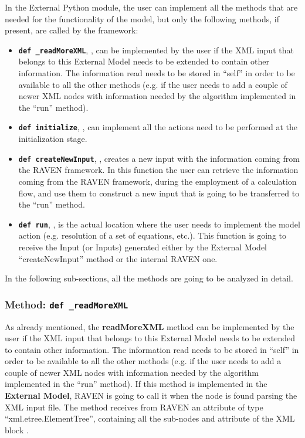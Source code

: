 In the External Python module, the user can implement all the methods that are
needed for the functionality of the model, but only the following methods, if
present, are called by the framework:
\begin{itemize}
  \item \texttt{\textbf{def \_readMoreXML}}, , can be
  implemented by the user if the XML input that belongs to this External Model
  needs to be extended to contain other information.
  The information read needs to be stored in ``self'' in order to be available
  to all the other methods (e.g. if the user needs to add a couple of newer XML
  nodes with information needed by the algorithm implemented in the ``run''
  method).
  \item \texttt{\textbf{def initialize}}, , can
  implement all the actions need to be performed at the initialization stage.
  \item \texttt{\textbf{def createNewInput}}, , creates
  a new input with the information coming from the RAVEN framework.
  In this function the user can retrieve the information coming from the RAVEN
  framework, during the employment of a calculation flow, and use them to
  construct a new input that is going to be transferred to the ``run'' method.
  \item \texttt{\textbf{def run}}, , is the actual
  location where the user needs to implement the model action (e.g. resolution
  of a set of equations, etc.).
  This function is going to receive the Input (or Inputs) generated either by
  the External Model ``createNewInput'' method or the internal RAVEN one.
\end{itemize}

In the following sub-sections, all the methods are going to be analyzed in
detail.

\subsubsection{Method: \texttt{def \_readMoreXML}}
\label{subsubsec:externalReadMoreXML}
As already mentioned, the \textbf{readMoreXML} method can be implemented by the
user if the XML input that belongs to this External Model needs to be extended
to contain other information.
%
The information read needs to be stored in ``self'' in order to be available to
all the other methods (e.g. if the user needs to add a couple of newer XML nodes
with information needed by the algorithm implemented in the ``run'' method).
%
If this method is implemented in the \textbf{External Model}, RAVEN is going to
call it when the node  is found parsing the XML input
file.
%
The method receives from RAVEN an attribute of type ``xml.etree.ElementTree'',
containing all the sub-nodes and attribute of the XML block .
%

